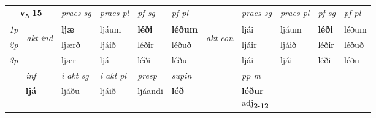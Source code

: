 \noindent
\begin{tabular}{lllllllllll} \toprule
\multicolumn{2}{c}{\textbf{v{\textsubscript{5}}} \Large{\textbf{15}}}  &  \textit{praes sg}  & \textit{praes pl}  &\textit{ pf sg} & \textit{pf pl} &  &  \textit{praes sg}  & \textit{praes pl}  & \textit{pf sg} & \textit{pf pl } \\*
	\cmidrule{3-6} \cmidrule{8-11}
 {\textit{1p}} & \multirow{3}{*}{\begin{turn}{90}\textit{akt ind}\end{turn}} & \textbf{ljæ} & ljáum & \textbf{léði} & \textbf{léðum} & \multirow{3}{*}{\begin{turn}{90}\textit{akt con}\end{turn}} &ljái & ljáum & \textbf{léði} & léðum\\*
 {\textit{2p}} &  &  ljærð  & ljáið & léðir & léðuð & & ljáir & ljáið & léðir & léðuð \\*
{\textit{3p}} &  & ljær & ljá & léði & léðu & & ljái & ljái& léði & léðu \\*
\cmidrule{3-6} \cmidrule{8-11}

   \multicolumn{2}{c}{\textit{inf}}  & \textit{i akt sg} & \textit{i akt pl}   & \textit{presp} & \textit{supin}  && \textit{pp m} \\*
  \multicolumn{2}{c}{\textbf{ljá}} & ljáðu  & ljáið   & ljáandi &  \textbf{léð}  && \specialcell{\textbf{léður} \\ adj\textbf{\textsubscript{2-12}}} \\*
\end{tabular}

